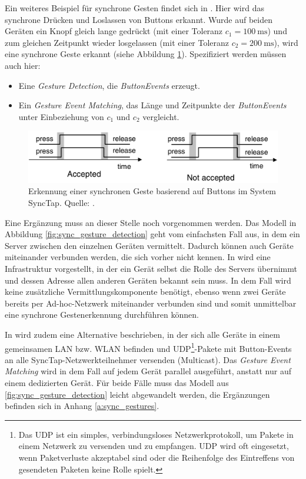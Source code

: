 Ein weiteres Beispiel für synchrone Gesten findet sich in \citep{Rekimoto2004}. Hier wird das synchrone Drücken und Loslassen von Buttons erkannt. Wurde auf beiden Geräten ein Knopf gleich lange gedrückt (mit einer Toleranz \(c_1=\SI{100}{\milli\second}\)) und zum gleichen Zeitpunkt wieder losgelassen (mit einer Toleranz \(c_2=\SI{200}{\milli\second}\)), wird eine synchrone Geste erkannt (siehe Abbildung \ref{fig:sync_tap}). Spezifiziert werden müssen auch hier:
\begin{itemize}
\item Eine \textit{Gesture Detection}, die \textit{ButtonEvents} erzeugt.
\item Ein \textit{Gesture Event Matching}, das Länge und Zeitpunkte der \textit{ButtonEvents} unter Einbeziehung von \(c_1\) und \(c_2\) vergleicht.
\end{itemize}

\begin{figure}[h]
\centering
\includegraphics[width=1\textwidth]{bilder/sync_tap.png}
\caption{Erkennung einer synchronen Geste basierend auf Buttons im System SyncTap. Quelle: \citep{Rekimoto2004}.}
\label{fig:sync_tap}
\end{figure}

Eine Ergänzung muss an dieser Stelle noch vorgenommen werden. Das Modell in Abbildung \ref{fig:sync_gesture_detection} geht vom einfachsten Fall aus, in dem ein Server zwischen den einzelnen Geräten vermittelt. Dadurch können auch Geräte miteinander verbunden werden, die sich vorher nicht kennen. In \citep{Hinckley2004} wird eine Infrastruktur vorgestellt, in der ein Gerät selbst die Rolle des Servers übernimmt und dessen Adresse allen anderen Geräten bekannt sein muss. In dem Fall wird keine zusätzliche Vermittlungskomponente benötigt, ebenso wenn zwei Geräte bereits per Ad-hoc-Netzwerk miteinander verbunden sind und somit unmittelbar eine synchrone Gestenerkennung durchführen können.

In \citep{Rekimoto2004} wird zudem eine Alternative beschrieben, in der sich alle Geräte in einem gemeinsamen LAN bzw. WLAN befinden und UDP\footnote{Das \ac{UDP} ist ein simples, verbindungsloses Netzwerkprotokoll, um Pakete in einem Netzwerk zu versenden und zu empfangen. UDP wird oft eingesetzt, wenn Paketverluste akzeptabel sind oder die Reihenfolge des Eintreffens von gesendeten Paketen keine Rolle spielt.}-Pakete mit Button-Events an alle SyncTap-Netzwerkteilnehmer versenden (Multicast). Das \textit{Gesture Event Matching} wird in dem Fall auf jedem Gerät parallel ausgeführt, anstatt nur auf einem dedizierten Gerät. Für beide Fälle muss das Modell aus \ref{fig:sync_gesture_detection} leicht abgewandelt werden, die Ergänzungen befinden sich in Anhang \ref{a:sync_gestures}.

